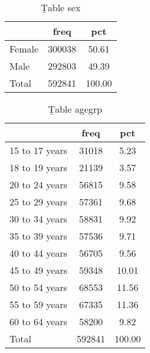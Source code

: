 \begin{table}[htbp]\centering
\def\sym#1{\ifmmode^{#1}\else\(^{#1}\)\fi}
\caption{{\b Table sex}}
\begin{tabular}{l*{1}{cc}}
\hline\hline
                              &        freq&         pct\\
\hline
Female                        &      300038&       50.61\\
Male                          &      292803&       49.39\\
Total                         &      592841&      100.00\\
\hline\hline
\end{tabular}
\end{table}
\begin{table}[htbp]\centering
\def\sym#1{\ifmmode^{#1}\else\(^{#1}\)\fi}
\caption{{\b Table agegrp}}
\begin{tabular}{l*{1}{cc}}
\hline\hline
                              &        freq&         pct\\
\hline
15 to 17 years                &       31018&        5.23\\
18 to 19 years                &       21139&        3.57\\
20 to 24 years                &       56815&        9.58\\
25 to 29 years                &       57361&        9.68\\
30 to 34 years                &       58831&        9.92\\
35 to 39 years                &       57536&        9.71\\
40 to 44 years                &       56705&        9.56\\
45 to 49 years                &       59348&       10.01\\
50 to 54 years                &       68553&       11.56\\
55 to 59 years                &       67335&       11.36\\
60 to 64 years                &       58200&        9.82\\
Total                         &      592841&      100.00\\
\hline\hline
\end{tabular}
\end{table}
